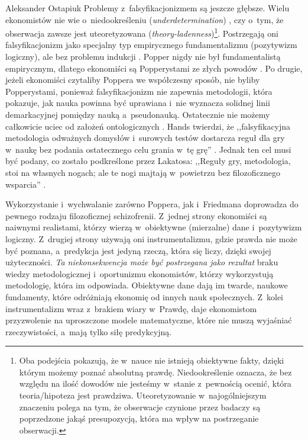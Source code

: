 \begin{artplenv}{Aleksander Ostapiuk}
Problemy z~falsyfikacjonizmem są jeszcze głębsze. Wielu ekonomistów nie wie o~niedookreśleniu
(\textit{underdetermination})
\parencite{quine_two_1951},
czy o~tym, że obserwacja zawsze jest
uteoretyzowana (\textit{theory-ladenness})\footnote{Oba podejścia pokazują, że w~nauce nie istnieją obiektywne fakty,
dzięki którym możemy poznać absolutną prawdę. Niedookreślenie oznacza, że bez względu na ilość dowodów nie jesteśmy
w~stanie z~pewnością ocenić, która teoria/hipoteza jest prawdziwa. Uteoretyzowanie w~najogólniejszym znaczeniu polega na
tym, że obserwacje czynione przez badaczy są poprzedzone jakąś presupozycją, która ma wpływ na postrzeganie obserwacji.}.
Postrzegają oni falsyfikacjonizm jako specjalny typ empirycznego fundamentalizmu (pozytywizm logiczny), ale bez
problemu indukcji
\parencite[s.~292]{hands_reflection_2001}.
Popper nigdy nie był fundamentalistą empirycznym,
dlatego ekonomiści są Popperystami ze złych powodów
\parencite[s.~292]{hands_reflection_2001}.
Po drugie, jeżeli
ekonomiści czytaliby Poppera we współczesny sposób, nie byliby Popperystami, ponieważ falsyfikacjonizm nie zapewnia
metodologii, która pokazuje, jak nauka powinna być uprawiana i~nie wyznacza solidnej linii demarkacyjnej pomiędzy nauką
a~pseudonauką. Ostatecznie nie możemy całkowicie uciec od założeń ontologicznych
\parencite{kuhn_structure_1962,feyerabend_against_1975,mccloskey_rhetoric_1998,hands_reflection_2001}.
Hands twierdzi, że ,,falsyfikacyjna metodologia odważnych
domysłów i~surowych testów dostarcza reguł dla gry w~naukę bez podania ostatecznego celu grania w~tę grę''
\parencite[s.~293]{hands_reflection_2001}.
Jednak ten cel musi być podany, co zostało podkreślone przez Lakatosa:
,,Reguły gry, metodologia, stoi na własnych nogach; ale te nogi majtają w~powietrzu bez filozoficznego wsparcia''
\parencite[s.~154]{lakatos_methodology_1980}.

Wykorzystanie i~wychwalanie zarówno Poppera, jak i~Friedmana doprowadza do pewnego rodzaju filozoficznej
schizofrenii. Z~jednej strony ekonomiści są naiwnymi realistami, którzy wierzą w~obiektywne (mierzalne)
dane i~pozytywizm logiczny. Z~drugiej strony używają oni instrumentalizmu,
gdzie prawda nie może być poznana, a~predykcja jest jedyną rzeczą, która
się liczy, dzięki swojej użyteczności. \textit{Ta niekonsekwencja może być postrzegana jako rezultat} braku wiedzy
metodologicznej i~oportunizmu ekonomistów, którzy wykorzystują metodologię, która im odpowiada. Obiektywne dane dają im
twarde, naukowe fundamenty, które odróżniają ekonomię od innych nauk społecznych. Z~kolei instrumentalizm
wraz z~brakiem wiary w~Prawdę, daje ekonomistom przyzwolenie na uproszczone modele matematyczne,
które nie muszą wyjaśniać
rzeczywistości, a~mają tylko siłę predykcyjną. 


\end{artplenv}
